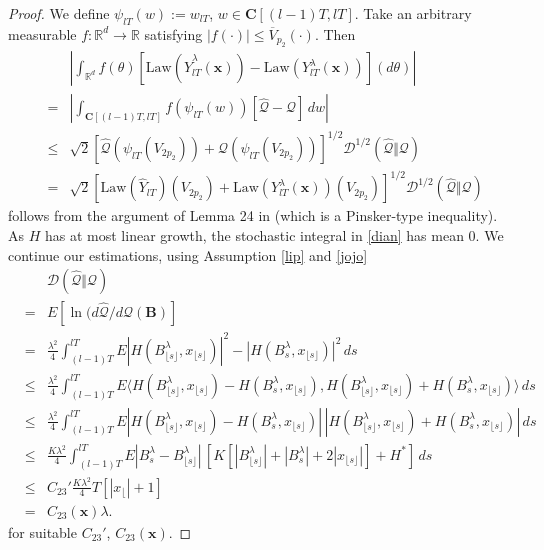\documentclass[a4paper,draft]{article}
\begin{document}
\begin{proof}
We define $\psi_{lT}(w):=w_{lT}$, $w\in\mathbf{C}[(l-1)T,lT]$.
Take an arbitrary measurable $f:\mathbb{R}^d\to\mathbb{R}$ satisfying
$|f(\cdot)|\leq \overline{V}_{p_2}(\cdot)$. Then
\begin{eqnarray*}
& & \left| \int_{\mathbb{R}^d} f(\theta)
[\mathrm{Law}(\hat{Y}_{lT}^{\lambda}(\mathbf{x}))-\mathrm{Law}({Y}_{lT}^{\lambda}(\mathbf{x}))](d\theta)\right|\\
&=&
\left| \int_{\mathbf{C}[(l-1)T,lT]} f(\psi_{lT}(w))[\hat{\mathcal{Q}}-
\mathcal{Q}]\, dw\right|\\
&\leq & \sqrt{2}[\hat{\mathcal{Q}}(\psi_{lT}(V_{2p_2}))+\mathcal{Q}(\psi_{lT}(V_{2p_2}))]^{1/2}
\mathcal{D}^{1/2}(\hat{\mathcal{Q}}\Vert\mathcal{Q})\\
&=& \sqrt{2}[\mathrm{Law}(\hat{Y}_{lT})(V_{2p_2})+\mathrm{Law}({Y}^{\lambda}_{lT}(\mathbf{x}))(V_{2p_2})]^{1/2}
\mathcal{D}^{1/2}(\hat{\mathcal{Q}}\Vert \mathcal{Q})
\end{eqnarray*}
follows from the argument of Lemma 24 in \cite{unadjusted} (which is a Pinsker-type inequality).
As $H$ has at most linear growth, the stochastic integral in \eqref{dian}
has mean $0$. We continue our estimations, using Assumption \ref{lip} and \eqref{jojo}
\begin{eqnarray*}
& & \mathcal{D}(\hat{\mathcal{Q}}\Vert\mathcal{Q})\\
&=& E[\ln(d\hat{\mathcal{Q}}/d\mathcal{Q}(\mathbf{B})]\\
&=& \frac{\lambda^2}{4}\int_{(l-1)T}^{lT}
E|H(B^{\lambda}_{\lfloor s\rfloor},x_{\lfloor s\rfloor})|^2
-|H(B^{\lambda}_s,x_{\lfloor s\rfloor})|^2\, ds\\
&\leq& \frac{\lambda^2}{4}\int_{(l-1)T}^{lT}
E\langle H(B^{\lambda}_{\lfloor s\rfloor},x_{\lfloor s\rfloor})
-H(B^{\lambda}_s,x_{\lfloor s\rfloor}),H(B^{\lambda}_{\lfloor s\rfloor},x_{\lfloor s\rfloor})
+H(B^{\lambda}_s,x_{\lfloor s\rfloor})\rangle\, ds\\
&\leq&
\frac{\lambda^2}{4}\int_{(l-1)T}^{lT}
E|H(B^{\lambda}_{\lfloor s\rfloor},x_{\lfloor s\rfloor})
-H(B^{\lambda}_s,x_{\lfloor s\rfloor})|\, |H(B^{\lambda}_{\lfloor s\rfloor},x_{\lfloor s\rfloor})
+H(B^{\lambda}_s,x_{\lfloor s\rfloor})|\, ds\\
&\leq& \frac{K\lambda^2}{4} \int_{(l-1)T}^{lT}
E|B^{\lambda}_s-B^{\lambda}_{\lfloor s\rfloor}|\, [K[|B^{\lambda}_{\lfloor s\rfloor}|+|B^{\lambda}_s|+
2|x_{\lfloor s\rfloor}|]+H^*] \, ds\\
&\leq & C_{23}'\frac{K\lambda^2}{4} T [|x_{\lfloor}|+1]\\
&=& C_{23}(\mathbf{x})\lambda.
\end{eqnarray*}
for suitable $C_{23}'$, $C_{23}(\mathbf{x})$.
\end{proof}
\end{document}
